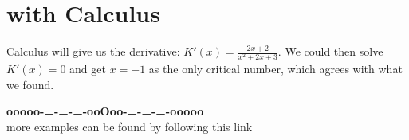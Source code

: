 \documentclass{ximera}
\begin{document}
\section*{with Calculus}

Calculus will give us the derivative: $K'(x) = \frac{2x+2}{x^2+2x+3}$.  We could then solve $K'(x) = 0$ and get $x=-1$ as the only critical number, which agrees with what we found.











\begin{center}
\textbf{\textcolor{green!50!black}{ooooo-=-=-=-ooOoo-=-=-=-ooooo}} \\

more examples can be found by following this link\\ 

\end{center}
\end{document}
